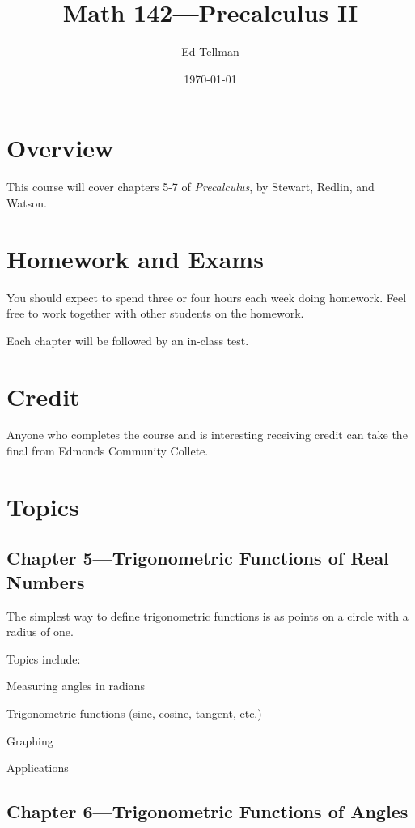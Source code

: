 \documentclass[fleqn, onecolumn]{article}
\author{Ed Tellman}
\title{Math 142---Precalculus II}
\date{\today}
\begin{document}
  \maketitle

  \section{Overview}
  This course will cover chapters 5-7 of {\em Precalculus}, by Stewart, Redlin, and Watson.  

  \section{Homework and Exams}

  You should expect to spend three or four hours each week doing homework.  Feel free to work together with other students
  on the homework.

  Each chapter will be followed by an in-class test.  

  \section{Credit}
  Anyone who completes the course and is interesting receiving credit can take the final from Edmonds Community Collete.

  \section{Topics}

  \subsection{Chapter 5---Trigonometric Functions of Real Numbers}

  The simplest way to define trigonometric functions is as points on a circle with a radius of one.

  Topics include:
  \begin{itemize*}
    \item Measuring angles in radians
    \item Trigonometric functions (sine, cosine, tangent, etc.)
    \item Graphing 
    \item Applications 
  \end{itemize*}

  \subsection{Chapter 6---Trigonometric Functions of Angles}
\end{document}
